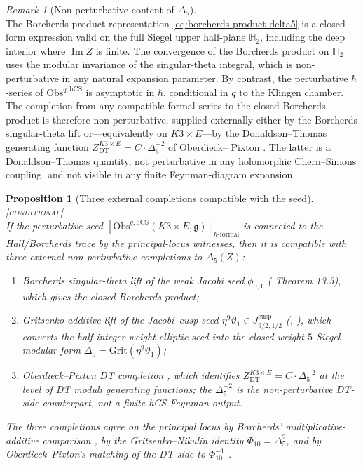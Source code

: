 \documentclass[11pt]{amsart}
\providecommand{\frakg}{\mathfrak{g}}
\providecommand{\Obs}{\mathrm{Obs}}
\providecommand{\hCS}{\mathrm{hCS}}
\providecommand{\Im}{\operatorname{Im}}
\providecommand{\Grit}{\mathrm{Grit}}
\providecommand{\ClaimStatusConditional}{\textsc{[conditional]}}
\theoremstyle{plain}
\newtheorem{proposition}[theorem]{Proposition}
\theoremstyle{definition}
\theoremstyle{remark}
\newtheorem{remark}[theorem]{Remark}
\begin{document}
\begin{remark}[Non-perturbative content of $\Delta_{5}$]
\label{rem:non-perturbative-delta5}
\ClaimStatusDerivation{}\\
The Borcherds product representation
\eqref{eq:borcherds-product-delta5} is a closed-form expression valid
on the full Siegel upper half-plane $\mathbb{H}_{2}$, including the
deep interior where $\Im Z$ is finite. The convergence of the
Borcherds product on $\mathbb{H}_{2}$ uses the modular invariance of
the singular-theta integral, which is non-perturbative in any natural
expansion parameter. By contrast, the perturbative $\hbar$-series of
$\Obs^{q,\hCS}$ is asymptotic in $\hbar$, conditional in $q$ to the
Klingen chamber. The completion from any compatible formal series to
the closed Borcherds product is therefore non-perturbative, supplied
externally either by the Borcherds singular-theta lift
\cite{Borcherds1998} or---equivalently on $K3\times E$---by the
Donaldson--Thomas generating function
$Z^{K3\times E}_{\mathrm{DT}}=C\cdot\Delta_{5}^{-2}$ of Oberdieck--%
Pixton \cite{OberdieckPixton2019}. The latter is a Donaldson--Thomas
quantity, not perturbative in any holomorphic Chern--Simons coupling,
and not visible in any finite Feynman-diagram expansion.
\end{remark}

\begin{proposition}[Three external completions compatible with the seed]
\label{prop:three-completions-perturbative-seed}
\ClaimStatusConditional{}\\
If the perturbative seed
$[\Obs^{q,\hCS}(K3\times E,\frakg)]_{\hbar\text{-formal}}$ is connected
to the Hall/Borcherds trace by the principal-locus witnesses, then it is
compatible with three external non-perturbative completions to
$\Delta_{5}(Z)$:
\begin{enumerate}
\item[\textup{(a)}] Borcherds singular-theta lift of the weak Jacobi
seed $\phi_{0,1}$ (\cite{Borcherds1998} Theorem 13.3), which gives the
closed Borcherds product;
\item[\textup{(b)}] Gritsenko additive lift of the Jacobi--cusp seed
$\eta^{9}\vartheta_{1}\in J_{9/2,1/2}^{\mathrm{cusp}}$
(\cite{GritsenkoNikulin1995}, \cite{Lorgat2020}), which converts the
half-integer-weight elliptic seed into the closed weight-$5$ Siegel
modular form $\Delta_{5}=\Grit(\eta^{9}\vartheta_{1})$;
\item[\textup{(c)}] Oberdieck--Pixton DT completion
\cite{OberdieckPixton2019}, which identifies
$Z^{K3\times E}_{\mathrm{DT}}=C\cdot\Delta_{5}^{-2}$ at the level of
DT moduli generating functions; the $\Delta_{5}^{-2}$ is the
non-perturbative DT-side counterpart, not a finite hCS Feynman output.
\end{enumerate}
The three completions agree on the principal locus by Borcherds'
multiplicative-additive comparison
\cite{Borcherds1998}, by the Gritsenko--Nikulin identity
$\Phi_{10}=\Delta_{5}^{2}$, and by Oberdieck--Pixton's matching of the
DT side to $\Phi_{10}^{-1}$ \cite{OberdieckPixton2019}.
\end{proposition}
\end{document}
